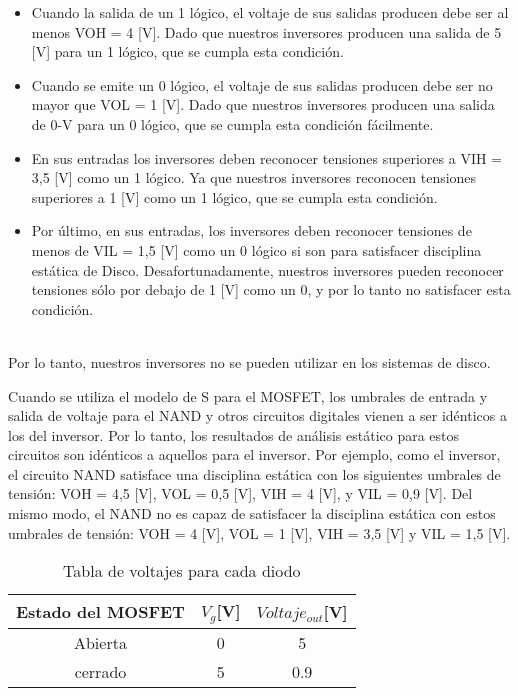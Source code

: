 \documentclass[11pt,fancy,lang=es]{elegantbook}
\begin{document}
\begin{itemize}
    \item Cuando la salida de un 1 lógico, el voltaje de sus salidas
          producen debe ser al menos VOH = 4 [V]. Dado que nuestros inversores producen
          una salida de 5 [V] para un 1 lógico, que se cumpla esta condición.
    \item Cuando se emite un 0 lógico, el voltaje de sus salidas producen
          debe ser no mayor que VOL = 1 [V]. Dado que nuestros inversores producen
          una salida de 0-V para un 0 lógico, que se cumpla esta condición
          fácilmente.
    \item En sus entradas los inversores deben reconocer tensiones superiores
          a VIH = 3,5 [V] como un 1 lógico. Ya que nuestros inversores reconocen
          tensiones superiores a 1 [V] como un 1 lógico, que se cumpla esta
          condición.
    \item Por último, en sus entradas, los inversores deben reconocer
          tensiones de menos de VIL = 1,5 [V] como un 0 lógico si son para
          satisfacer disciplina estática de Disco. Desafortunadamente, nuestros
          inversores pueden reconocer tensiones sólo por debajo de 1 [V] como
          un 0, y por lo tanto no satisfacer esta condición.
\end{itemize}\\


{Por lo tanto, nuestros inversores no se pueden utilizar en los sistemas
de disco.}

{Cuando se utiliza el modelo de S para el MOSFET, los umbrales de entrada
y salida de voltaje para el NAND y otros circuitos digitales vienen a ser
idénticos a los del inversor. Por lo tanto, los resultados de análisis
estático para estos circuitos son idénticos a aquellos para
el inversor. Por ejemplo, como el inversor, el circuito NAND satisface una
disciplina estática con los siguientes umbrales de tensión:
VOH = 4,5 [V], VOL = 0,5 [V], VIH = 4 [V], y VIL = 0,9 [V]. Del mismo modo, el NAND
no es capaz de satisfacer la disciplina estática con estos umbrales
de tensión: VOH = 4 [V], VOL = 1 [V], VIH = 3,5 [V] y VIL = 1,5 [V].}
\begin{table}[ht]
    \begin{center}
        \caption{Tabla de voltajes para cada diodo}
        \label{table1}
        \begin{tabular}{ccc}
            \hline
            {Estado del MOSFET} & {$V_{g}$[V]} & {$Voltaje_{out}$[V]} \\
            \hline
            Abierta             & 0            & 5                    \\
            cerrado             & 5            & 0.9                  \\
            \hline
        \end{tabular}
    \end{center}
\end{table}
\end{document}
